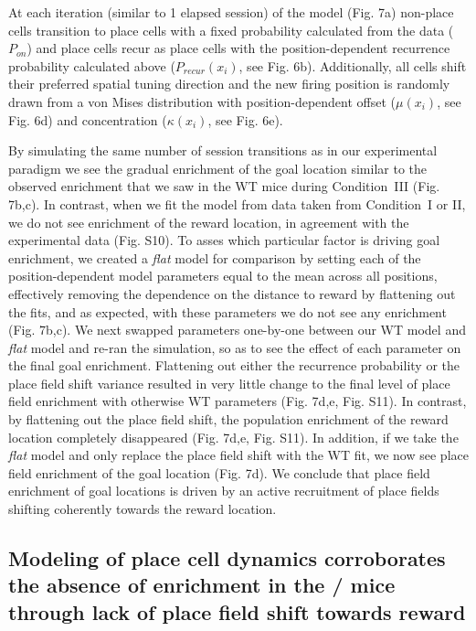 At each iteration (similar to 1 elapsed session) of the model (Fig. 7a) non-place cells transition to place cells with a fixed probability calculated from the data ($P_{on}$) and place cells recur as place cells with the position-dependent recurrence probability calculated above ($P_{recur}(x_i)$, see Fig. 6b). Additionally, all cells shift their preferred spatial tuning direction and the new firing position is randomly drawn from a von Mises distribution with position-dependent offset ($\mu(x_i)$, see Fig. 6d) and concentration ($\kappa(x_i)$, see Fig. 6e).

By simulating the same number of session transitions as in our experimental paradigm we see the gradual enrichment of the goal location similar to the observed enrichment that we saw in the WT mice during Condition~III (Fig. 7b,c).  In contrast, when we fit the model from data taken from Condition~I or II, we do not see enrichment of the reward location, in agreement with the experimental data (Fig. S10). To asses which particular factor is driving goal enrichment, we created a \emph{flat} model for comparison by setting each of the position-dependent model parameters equal to the mean across all positions, effectively removing the dependence on the distance to reward by flattening out the fits, and as expected, with these parameters we do not see any enrichment (Fig. 7b,c). We next swapped parameters one-by-one between our WT model and \emph{flat} model and re-ran the simulation, so as to see the effect of each parameter on the final goal enrichment. Flattening out either the recurrence probability or the place field shift variance resulted in very little change to the final level of place field enrichment with otherwise WT parameters (Fig. 7d,e, Fig. S11). In contrast, by flattening out the place field shift, the population enrichment of the reward location completely disappeared (Fig. 7d,e, Fig. S11). In addition, if we take the \emph{flat} model and only replace the place field shift with the WT fit, we now see place field enrichment of the goal location (Fig. 7d). We conclude that place field enrichment of goal locations is driven by an active recruitment of place fields shifting coherently towards the reward location.

\subsection{Modeling of place cell dynamics corroborates the absence of enrichment in the \df/ mice through lack of place field shift towards reward}

